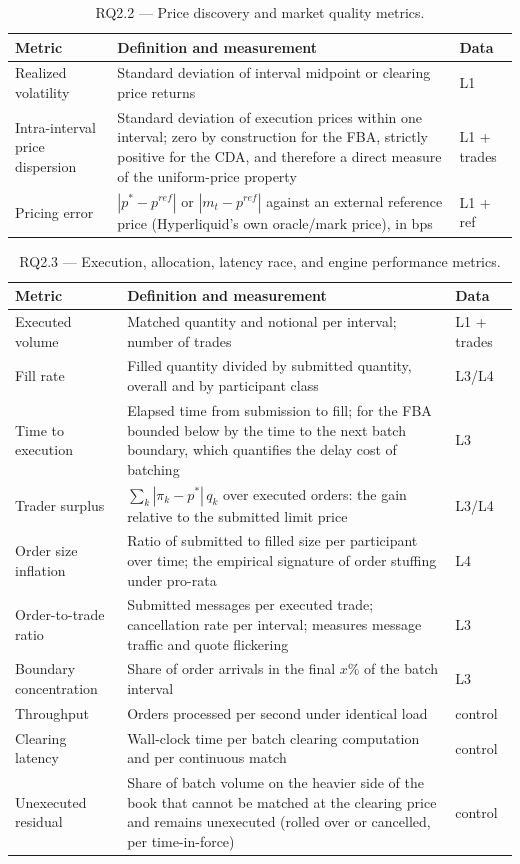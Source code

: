 \documentclass[11pt]{article}
\begin{document}
\begin{table}[htbp]
\centering
\small
\caption{RQ2.2 --- Price discovery and market quality metrics.}
\label{tab:quality}
\begin{tabularx}{\textwidth}{@{}p{3.3cm} L p{1.1cm}@{}}
\hline
\textbf{Metric} & \textbf{Definition and measurement} & \textbf{Data} \\
\hline
Realized volatility & Standard deviation of interval midpoint or clearing price returns & L1 \\
Intra-interval price dispersion & Standard deviation of execution prices within one interval; zero by construction for the FBA, strictly positive for the CDA, and therefore a direct measure of the uniform-price property & L1 + trades \\
Pricing error & $|p^{*}-p^{ref}|$ or $|m_t-p^{ref}|$ against an external reference price (Hyperliquid's own oracle/mark price), in bps & L1 + ref \\
\hline
\end{tabularx}
\end{table}

\begin{table}[htbp]
\centering
\small
\caption{RQ2.3 --- Execution, allocation, latency race, and engine performance metrics.}
\label{tab:execution}
\begin{tabularx}{\textwidth}{@{}p{3.3cm} L p{1.1cm}@{}}
\hline
\textbf{Metric} & \textbf{Definition and measurement} & \textbf{Data} \\
\hline
Executed volume & Matched quantity and notional per interval; number of trades & L1 + trades \\
Fill rate & Filled quantity divided by submitted quantity, overall and by participant class & L3/L4 \\
Time to execution & Elapsed time from submission to fill; for the FBA bounded below by the time to the next batch boundary, which quantifies the delay cost of batching & L3 \\
Trader surplus & $\sum_k |\pi_k - p^{*}| \, q_k$ over executed orders: the gain relative to the submitted limit price & L3/L4 \\
Order size inflation & Ratio of submitted to filled size per participant over time; the empirical signature of order stuffing under pro-rata & L4 \\
Order-to-trade ratio & Submitted messages per executed trade; cancellation rate per interval; measures message traffic and quote flickering & L3 \\
Boundary concentration & Share of order arrivals in the final $x\%$ of the batch interval & L3 \\
Throughput & Orders processed per second under identical load & control \\
Clearing latency & Wall-clock time per batch clearing computation and per continuous match & control \\
Unexecuted residual & Share of batch volume on the heavier side of the book that cannot be matched at the clearing price and remains unexecuted (rolled over or cancelled, per time-in-force) & control \\
\hline
\end{tabularx}
\end{table}
\end{document}
